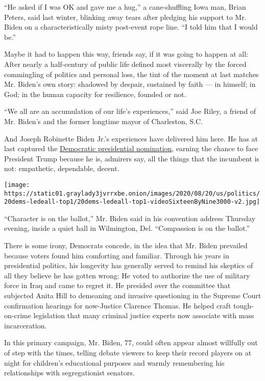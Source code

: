 ``He asked if I was OK and gave me a hug,'' a cane-shuffling Iowa man,
Brian Peters, said last winter, blinking away tears after pledging his
support to Mr. Biden on a characteristically misty post-event rope line.
``I told him that I would be.''

Maybe it had to happen this way, friends say, if it was going to happen
at all: After nearly a half-century of public life defined most
viscerally by the forced commingling of politics and personal loss, the
tint of the moment at last matches Mr. Biden's own story: shadowed by
despair, sustained by faith --- in himself; in God; in the human
capacity for resilience, founded or not.

``We all are an accumulation of our life's experiences,'' said Joe
Riley, a friend of Mr. Biden's and the former longtime mayor of
Charleston, S.C.

And Joseph Robinette Biden Jr.'s experiences have delivered him here. He
has at last captured the
\href{https://www.nytimes3xbfgragh.onion/2020/08/20/us/politics/Joe-Biden-accepts-democratic-nomination.html}{Democratic
presidential nomination}, earning the chance to face President Trump
because he is, admirers say, all the things that the incumbent is not:
empathetic, dependable, decent.

\texttt{[image: https://static01.graylady3jvrrxbe.onion/images/2020/08/20/us/politics/20dems-ledeall-top1/20dems-ledeall-top1-videoSixteenByNine3000-v2.jpg]}

``Character is on the ballot,'' Mr. Biden said in his convention address
Thursday evening, inside a quiet hall in Wilmington, Del. ``Compassion
is on the ballot.''

There is some irony, Democrats concede, in the idea that Mr. Biden
prevailed because voters found him comforting and familiar. Through his
years in presidential politics, his longevity has generally served to
remind his skeptics of all they believe he has gotten wrong: He voted to
authorize the use of military force in Iraq and came to regret it. He
presided over the committee that subjected Anita Hill to demeaning and
invasive questioning in the Supreme Court confirmation hearings for
now-Justice Clarence Thomas. He helped craft tough-on-crime legislation
that many criminal justice experts now associate with mass
incarceration.

In this primary campaign, Mr. Biden, 77, could often appear almost
willfully out of step with the times, telling debate viewers to keep
their record players on at night for children's educational purposes and
warmly remembering his relationships with segregationist senators.


